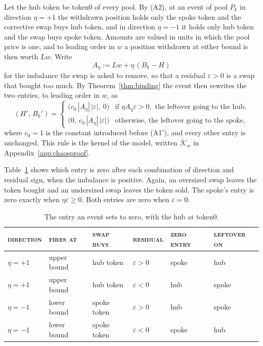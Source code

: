 \documentclass[11pt,a4paper]{article}
\DeclareRobustCommand{\thd}[1]{{\scshape\addfontfeatures{LetterSpace=1.5}\MakeLowercase{#1}}}
\theoremstyle{siphon}
\begin{document}
Let the hub token be token0 of every pool. By (A2), at an event of pool $P_k$ in direction $\eta = +1$ the withdrawn position holds only the spoke token and the corrective swap buys hub token, and in direction $\eta = -1$ it holds only hub token and the swap buys spoke token. Amounts are valued in units in which the pool price is one, and to leading order in $w$ a position withdrawn at either bound is then worth $Lw$. Write
\begin{equation}\label{eq:imbalance}
A_\eta  :=  Lw + \eta\,(B_k - H)
\end{equation}
for the imbalance the swap is asked to remove, so that a residual $\varepsilon > 0$ is a swap that bought too much. By Theorem~\ref{thm:binding} the event then rewrites the two entries, to leading order in $w$, as
\begin{equation}\label{eq:Khom}
(H',\, B_k')  = 
\begin{cases}
\bigl(c_0\,|A_\eta|\,|\varepsilon|,\ 0\bigr) & \text{if } \eta A_\eta \varepsilon > 0, \text{ the leftover going to the hub,} \\[3pt]
\bigl(0,\ c_0\,|A_\eta|\,|\varepsilon|\bigr) & \text{otherwise, the leftover going to the spoke,}
\end{cases}
\end{equation}
where $c_0 = 1$ is the constant introduced before (A1$'$), and every other entry is unchanged. This rule is the kernel of the model, written $\widetilde{\mathcal{K}}_w$ in Appendix~\ref{app:chaosproof}.

Table~\ref{tab:kernel_sides} shows which entry is zero after each combination of direction and residual sign, when the imbalance is positive. Again, an oversized swap leaves the token bought and an undersized swap leaves the token sold. The spoke's entry is zero exactly when $\eta \varepsilon \geq 0$. Both entries are zero when $\varepsilon = 0$.

\begin{table}[!htb]
\centering
\caption{The entry an event sets to zero, with the hub at token0.}
\label{tab:kernel_sides}
\begin{tabular}{@{}llllll@{}}
\toprule
\thd{Direction} & \thd{Fires at} & \thd{Swap buys} & \thd{Residual} & \thd{Zero entry} & \thd{Leftover on}  \\
\midrule
$\eta = +1$ & upper bound & hub token & $\varepsilon > 0$ & spoke & hub \\
$\eta = +1$ & upper bound & hub token & $\varepsilon < 0$ & hub & spoke \\
$\eta = -1$ & lower bound & spoke token & $\varepsilon > 0$ & hub & spoke \\
$\eta = -1$ & lower bound & spoke token & $\varepsilon < 0$ & spoke & hub \\
\bottomrule
\end{tabular}
\end{table}
\end{document}
